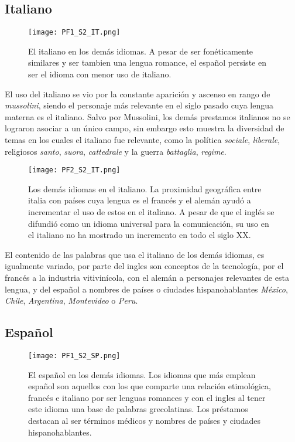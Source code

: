 

\subsection{Italiano} %

\begin{figure}%
	\centering
	\texttt{[image: PF1\_S2\_IT.png]}
	\label{fig.ST_a_IT}
	\caption{El italiano en los demás idiomas. A pesar de ser fonéticamente similares y ser tambien una lengua romance,  el español persiste en ser el idioma con menor uso de italiano.}
\end{figure}
		
		
El uso del italiano se vio por la constante aparición y ascenso en rango de \textit{mussolini}, siendo el personaje más relevante en el siglo pasado cuya lengua materna es el italiano.  Salvo por Mussolini, los demás prestamos italianos no se lograron asociar a un único campo, sin embargo esto muestra la diversidad de temas en los cuales el italiano fue relevante, como la política \textit{sociale}, \textit{liberale}, religiosos \textit{santo}, \textit{suora}, \textit{cattedrale} y la guerra \textit{battaglia}, \textit{regime}.


\begin{figure}%
	\centering
	\texttt{[image: PF2\_S2\_IT.png]}
	\label{fig.ST_b_IT}
	\caption{Los demás idiomas en el italiano. La proximidad geográfica  entre italia con países cuya lengua es el francés y el alemán ayudó a incrementar el uso de estos en el italiano. A pesar de que el inglés se difundió como un idioma universal para la comunicación, su uso en el italiano no ha mostrado un incremento en todo el siglo XX. }
\end{figure}

El contenido de las palabras que usa el italiano de los demás idiomas, es igualmente variado, por parte del ingles son conceptos de la tecnología, por el francés a la industria vitivinícola, con el alemán a personajes relevantes de esta lengua, y del español a nombres de países o ciudades hispanohablantes \textit{México}, \textit{Chile}, \textit{Argentina}, \textit{Montevideo} o \textit{Peru}. 



\subsection{Español} %

\begin{figure}[h!] %
	\centering
	\texttt{[image: PF1\_S2\_SP.png]}
	\label{fig.ST_a_SP}
	\caption{El español en los demás idiomas. Los idiomas que más emplean español son aquellos con los que comparte una relación etimológica, francés e italiano por ser lenguas romances y con el ingles al tener este idioma una base de palabras grecolatinas.  Los préstamos destacan al ser términos médicos y nombres de países y ciudades hispanohablantes.   }
\end{figure}

